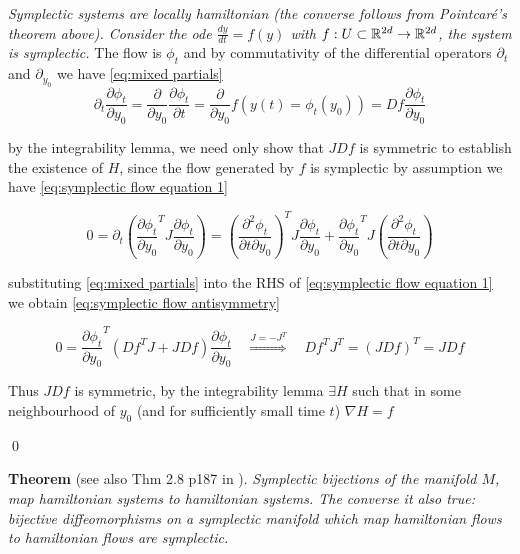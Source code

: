 \documentclass[12pt]{article}
\begin{document}
 \textit{Symplectic systems are locally hamiltonian (the converse follows from Pointcar\'e's theorem above). Consider the ode $\frac{dy}{dt} = f(y)$ with $f : U\subset \mathbb{R}^{2d}\to \mathbb{R}^{2d}$, the system is symplectic.} The flow is $\phi_t$ and by commutativity of the differential operators $\partial_t$ and $\partial_{y_0}$ we have \eqref{eq:mixed partials}
\begin{equation}\label{eq:mixed partials}
\partial_t \frac{\partial \phi_t}{\partial y_0} = \frac{\partial }{\partial y_0}\frac{\partial \phi_t}{\partial t} = \frac{\partial }{\partial y_0}f\left(y(t)=\phi_t(y_0)\right) = Df \frac{\partial \phi_t}{\partial y_0}
\end{equation}

by the integrability lemma, we need only show that $JDf$ is symmetric to establish the existence of $H$, since the flow generated by $f$ is symplectic by assumption we have \eqref{eq:symplectic flow equation 1} 

\begin{equation}\label{eq:symplectic flow equation 1}
    0 = \partial_t \left( \frac{\partial \phi_t}{\partial y_0}^T J \frac{\partial \phi_t}{\partial y_0} \right) = 
    \left( \frac{\partial^2 \phi_t}{\partial t\partial y_0} \right)^T J \frac{\partial \phi_t}{\partial y_0} + \frac{\partial \phi_t}{\partial y_0}^T J \left( \frac{\partial^2 \phi_t}{\partial t\partial y_0} \right)
\end{equation}

substituting \eqref{eq:mixed partials} into the RHS of \eqref{eq:symplectic flow equation 1} we obtain \eqref{eq:symplectic flow antisymmetry}

\begin{equation}\label{eq:symplectic flow antisymmetry}
    0 = \frac{\partial \phi_t}{\partial y_0}^T \left(
    Df^T J + JDf
    \right)\frac{\partial \phi_t}{\partial y_0}\quad \stackrel{J = -J^T}{\Longrightarrow}\quad Df^T J^T = (JDf)^T = JDf
\end{equation}

Thus $JDf$ is symmetric, by the integrability lemma $\exists H$ such that in some neighbourhood of $y_0$ (and for sufficiently small time $t$) $\nabla H = f$

\qed

\textbf{Theorem} (see also Thm 2.8 p187 in \cite{Numerical}). \textit{Symplectic bijections of the manifold $M$, map hamiltonian systems to hamiltonian systems. The converse it also true: bijective diffeomorphisms on a symplectic manifold which map hamiltonian flows to hamiltonian flows are symplectic.}
\end{document}

